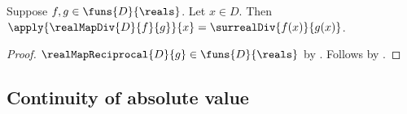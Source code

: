 \begin{proposition}\label{real_map_div_apply}
    Suppose $f,g\in\funs{D}{\reals}$.
    Let $x\in D$.
    Then $\apply{\realMapDiv{D}{f}{g}}{x}
        =\surrealDiv{f(x)}{g(x)}$.
\end{proposition}
\begin{proof}
    $\realMapReciprocal{D}{g}\in\funs{D}{\reals}$
        by .
    Follows by
        .
\end{proof}

\subsection{Continuity of absolute value}

